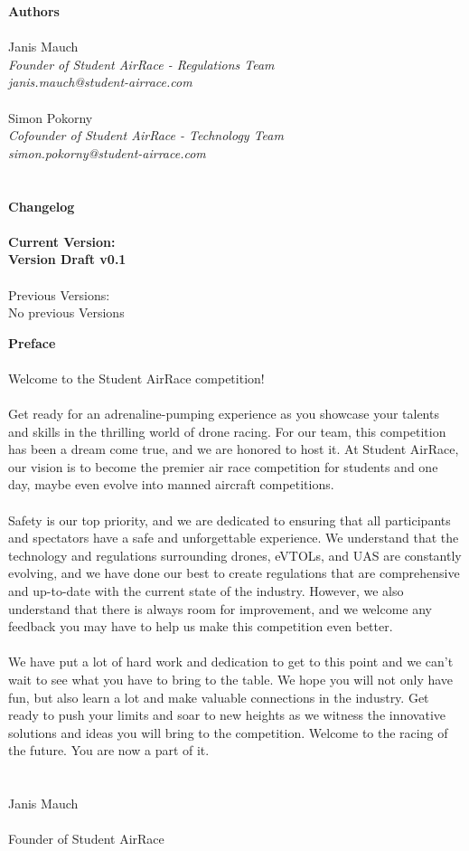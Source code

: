 \documentclass{article}
\newcommand*{\getVersion}{v0.1}
\begin{document}


\tableofcontents{}

\newpage
{\bf Authors}
\\ \\Janis Mauch \emph{\\Founder of Student AirRace - Regulations Team \\janis.mauch@student-airrace.com}
\\ \\ Simon Pokorny \emph{\\Cofounder of Student AirRace - Technology Team \\simon.pokorny@student-airrace.com}
\\ \\ \\
{\bf Changelog}
\\ \\{\bf Current Version: \\Version Draft \getVersion{}}
\\ \\Previous Versions: \\ No previous Versions

\newpage
{\bf Preface}
\\ \\ Welcome to the Student AirRace competition! \\ \\
Get ready for an adrenaline-pumping experience as you showcase your talents and skills in the thrilling world of drone racing. 
For our team, this competition has been a dream come true, and we are honored to host it. 
At Student AirRace, our vision is to become the premier air race competition for students and one day, maybe even evolve into manned aircraft competitions.
\\ \\ 
Safety is our top priority, and we are dedicated to ensuring that all participants and spectators have a safe and unforgettable experience. 
We understand that the technology and regulations surrounding drones, eVTOLs, and UAS are constantly evolving, and we have done our best to create regulations that are comprehensive and up-to-date with the current state of the industry. 
However, we also understand that there is always room for improvement, and we welcome any feedback you may have to help us make this competition even better.
\\ \\ 
We have put a lot of hard work and dedication to get to this point and we can't wait to see what you have to bring to the table. 
We hope you will not only have fun, but also learn a lot and make valuable connections in the industry. 
Get ready to push your limits and soar to new heights as we witness the innovative solutions and ideas you will bring to the competition. 
Welcome to the racing of the future. You are now a part of it.
\\ \\ \\
Janis Mauch 
\\ \\Founder of Student AirRace
\end{document}
